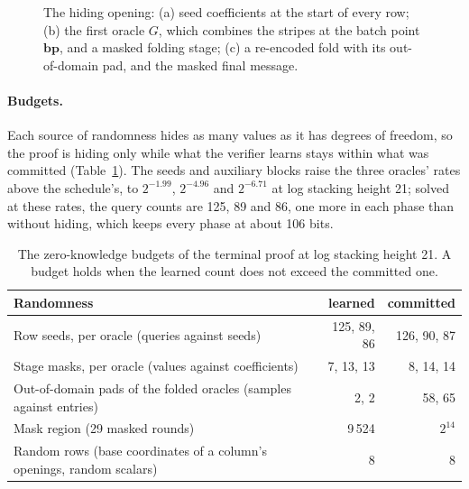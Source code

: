 \begin{figure}[t]
\centering
\resizebox{\textwidth}{!}{}
\caption{The hiding opening: (a) seed coefficients at the start of every row; (b) the first oracle $G$, which combines the stripes at the batch point $\bm{bp}$, and a masked folding stage; (c) a re-encoded fold with its out-of-domain pad, and the masked final message.}
\label{fig:zk-opening}
\end{figure}

\paragraph{Budgets.} Each source of randomness hides as many values as it has degrees of freedom, so the proof is hiding only while what the verifier learns stays within what was committed (Table~\ref{tab:zk-budget}). The seeds and auxiliary blocks raise the three oracles' rates above the schedule's, to $2^{-1.99}$, $2^{-4.96}$ and $2^{-6.71}$ at log stacking height 21; solved at these rates, the query counts are 125, 89 and 86, one more in each phase than without hiding, which keeps every phase at about 106 bits.

\begin{table}[t]
\centering
\small
\caption{The zero-knowledge budgets of the terminal proof at log stacking height 21. A budget holds when the learned count does not exceed the committed one.}
\label{tab:zk-budget}
\begin{tabular}{lrr}
\toprule
Randomness & learned & committed \\
\midrule
Row seeds, per oracle (queries against seeds) & 125, 89, 86 & 126, 90, 87 \\
Stage masks, per oracle (values against coefficients) & 7, 13, 13 & 8, 14, 14 \\
Out-of-domain pads of the folded oracles (samples against entries) & 2, 2 & 58, 65 \\
Mask region (29 masked \LogUp{} rounds) & 9\,524 & $2^{14}$ \\
Random rows (base coordinates of a column's openings, random scalars) & 8 & 8 \\
\bottomrule
\end{tabular}
\end{table}

